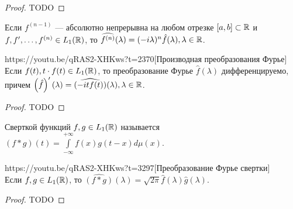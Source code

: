 \begin{proof}
	TODO
\end{proof}

\begin{corollary}
	Если $f^{(n-1)}$ --- абсолютно непрерывна на любом отрезке $[a,b]\subset\mathbb{R}$ и $f,f',\ldots,f^{(n)}\in L_1(\mathbb{R})$, то $\widehat{f^{(n)}}(\lambda)=(-i\lambda)^n\hat{f}(\lambda),\lambda\in\mathbb{R}$.
\end{corollary}

\begin{linkthm}{https://youtu.be/qRAS2-XHKws?t=2370}[Производная преобразования Фурье]\ \\ 
	Если $f(t),t\cdot f(t)\in L_1(\mathbb{R})$, то преобразование Фурье $\hat{f}(\lambda)$ дифференцируемо, причем $\left(\hat{f}\right)'(\lambda)=\widehat{(-itf(t))}(\lambda), \lambda\in\mathbb{R}$.
\end{linkthm}

\begin{proof}
	TODO
\end{proof}

\begin{Def}
	Сверткой функций $f,g\in L_1(\mathbb{R})$ называется $(f\ast g)(t)=\int\limits_{-\infty}^{+\infty}f(x)g(t-x)d\mu(x)$.
\end{Def}
\begin{linkthm}{https://youtu.be/qRAS2-XHKws?t=3297}[Преобразование Фурье свертки]\ \\
	Если $f,g\in L_1(\mathbb{R})$, то $\widehat{(f\ast g)}(\lambda)=\sqrt{2\pi}\hat{f}(\lambda)\hat{g}(\lambda)$.
\end{linkthm}
\begin{proof}
	TODO
\end{proof}








